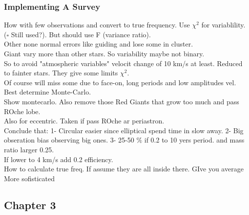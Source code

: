 \documentclass{article}
\newcommand{\parnum}{(\arabic{parcount})}
\newcounter{parcount}
\newenvironment{parnumbers}{%
	\setcounter{parcount}{0}
   \par%
   \everypar{\noindent \stepcounter{parcount}\parnum \hspace{1em}}%
}{}
\begin{document}
\subsubsection{Implementing A Survey}

\begin{parnumbers}
	How with few observations and convert to true frequency. Use $\chi ^2$ for variablility.  ($\square$ Still used?). But should use F (variance ratio). \\

Other none normal errors like guiding and lose some in cluster. \\

Giant vary more than other stars. So variability maybe not binary. \\

So to avoid "atmospheric variables" velocit change of 10 km/s at least. Reduced to fainter stars. They give some limits $\chi ^2$. \\

Of course will miss some due to face-on, long periods and low amplitudes vel. Best determine Monte-Carlo. \\

Show montecarlo. Also remove those Red Giants that grow too much and pass ROche lobe. \\

Also for eccentric. Taken if pass ROche ar periastron. \\

Conclude that: 1- Circular easier since elliptical spend time in slow away. 2- Big obseration bias observing big ones. 3- 25-50 $\%$ if 0.2 to 10 yers period. and mass ratio larger 0.25.\\

If lower to 4 km/s add 0.2 efficiency. \\

How to calculate true freq. If assume they are all inside there. GIve you average \\

More sofisticated 








\end{parnumbers}




\subsection{Chapter 3}
\end{document}
